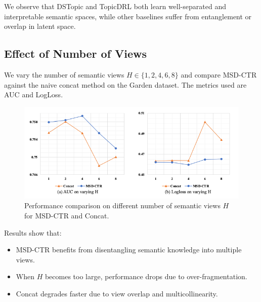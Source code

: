 We observe that DSTopic and TopicDRL both learn well-separated and interpretable semantic spaces, while other baselines suffer from entanglement or overlap in latent space.

\subsection{Effect of Number of Views}

We vary the number of semantic views $H \in \{1, 2, 4, 6, 8\}$ and compare MSD-CTR against the naive concat method on the Garden dataset. The metrics used are AUC and LogLoss.

\begin{figure}[htbp]
    \centering
    \includegraphics[width=\textwidth]{Figures/Chapter5/fig4.png}
    \caption{Performance comparison on different number of semantic views $H$ for MSD-CTR and Concat.}
    \label{fig:view-ablation}
\end{figure}

Results show that:
\begin{itemize}
    \item MSD-CTR benefits from disentangling semantic knowledge into multiple views.
    \item When $H$ becomes too large, performance drops due to over-fragmentation.
    \item Concat degrades faster due to view overlap and multicollinearity.
\end{itemize}
